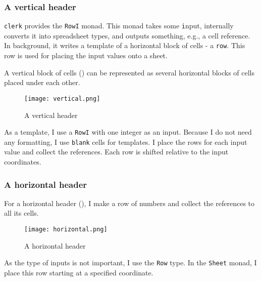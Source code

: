 \subsubsection{A vertical header}

\texttt{clerk} provides the \texttt{RowI} monad.
This monad takes some \texttt{i}nput, internally converts it into spreadsheet types, and outputs something, e.g., a cell reference.
In background, it writes a template of a horizontal block of cells - a \texttt{row}.
This row is used for placing the input values onto a sheet.

A vertical block of cells () can be represented as several horizontal blocks of cells placed under each other.

\begin{figure}[h]
  \centering
  \texttt{[image: vertical.png]}
  \caption{A vertical header}
  \label{fig:vertical}
\end{figure}

As a template, I use a \texttt{RowI} with one integer as an input.
Because I do not need any formatting, I use \texttt{blank} cells for templates. I place the rows for each input value and collect the references.
Each row is shifted relative to the input coordinates.

\pagebreak


\subsubsection{A horizontal header}

For a horizontal header (), I make a row of numbers and collect the references to all its cells.

\begin{figure}[h]
  \centering
  \texttt{[image: horizontal.png]}
  \caption{A horizontal header}
  \label{fig:horizontal}
\end{figure}

As the type of inputs is not important, I use the \texttt{Row} type.
In the \texttt{Sheet} monad, I place this row starting at a specified coordinate.

